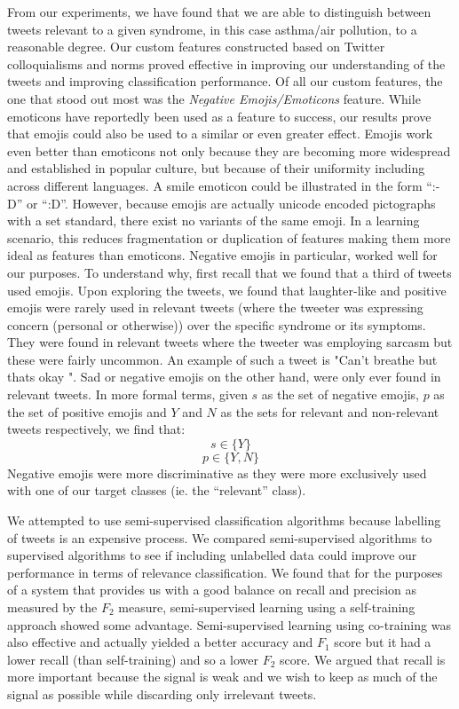\documentclass[10pt,letterpaper]{article}
\begin{document}
From our experiments, we have found that we are able to distinguish between tweets relevant to a given syndrome, in this case asthma/air pollution, to a reasonable degree. Our custom features constructed based on Twitter colloquialisms and norms proved effective in improving our understanding of the tweets and improving classification performance. Of all our custom features, the one that stood out most was the \textit{Negative Emojis/Emoticons} feature. While emoticons have reportedly been used as a feature to success\cite{REF18}, our results prove that emojis could also be used to a similar or even greater effect. Emojis work even better than emoticons not only because they are becoming more widespread and established in popular culture\cite{REF40}, but because of their uniformity including across different languages.  A smile emoticon could be illustrated in the form ``:-D'' or ``:D''. However, because emojis are actually unicode encoded pictographs with a set standard\cite{REF41}, there exist no variants of the same emoji. In a learning scenario, this reduces fragmentation or duplication of features making them more ideal as features than emoticons. Negative emojis in particular, worked well for our purposes. To understand why, first recall that we found that a third of tweets used emojis. Upon exploring the tweets, we found that laughter-like and positive emojis were rarely used in relevant tweets (where the tweeter was expressing concern (personal or otherwise)) over the specific syndrome or its symptoms. They were found in relevant tweets where the tweeter was employing sarcasm but these were fairly uncommon. An example of such a tweet is "Can't breathe but thats okay ". Sad or negative emojis on the other hand, were only ever found in relevant tweets. In more formal terms, given $s$ as the set of negative emojis, $p$ as the set of positive emojis and $Y$ and $N$ as the sets for relevant and non-relevant tweets respectively, we find that:
\begin{displaymath}
s \in \{Y\}
\end{displaymath}
\begin{displaymath}
p \in \{Y, N\}
\end{displaymath}
Negative emojis were more discriminative as they were more exclusively used with one of our target classes (ie. the ``relevant'' class).

We attempted to use semi-supervised classification algorithms because labelling of tweets is an expensive process. We compared semi-supervised algorithms to supervised algorithms to see if including unlabelled data could improve our performance in terms of relevance classification.  We found that for the purposes of a system that provides us with a good balance on recall and precision as measured by the $F_2$ measure, semi-supervised learning using a self-training approach showed some advantage. Semi-supervised learning using co-training was also effective and actually yielded a better accuracy and $F_1$ score but it had a lower recall (than self-training) and so a lower $F_2$ score. We argued that recall is more important because the signal is weak and we wish to keep as much of the signal as possible while discarding only irrelevant tweets.
\end{document}
